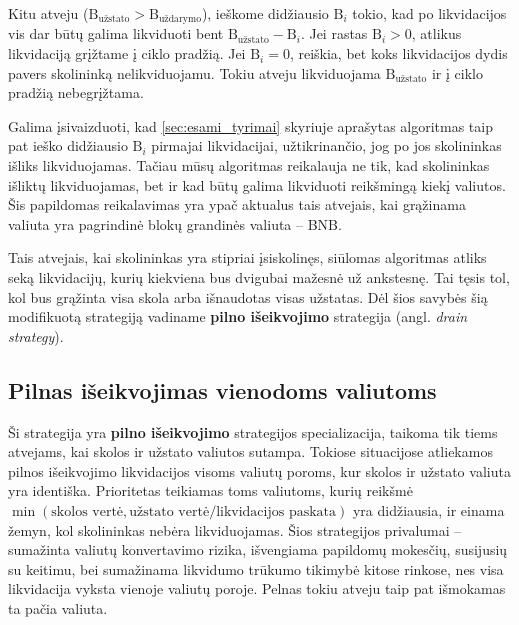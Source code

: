 \documentclass[]{VUMIFTemplateClass}
\begin{document}
Kitu atveju ($\text{B}_{\text{užstato}} > \text{B}_{\text{uždarymo}}$), ieškome didžiausio $\text{B}_{i}$ tokio, kad po likvidacijos vis dar būtų galima likviduoti bent $\text{B}_{\text{užstato}} - \text{B}_{i}$. Jei rastas $\text{B}_{i} > 0$, atlikus likvidaciją grįžtame į ciklo pradžią. Jei $\text{B}_{i} = 0$, reiškia, bet koks likvidacijos dydis pavers skolininką nelikviduojamu. Tokiu atveju likviduojama $\text{B}_{\text{užstato}}$ ir į ciklo pradžią nebegrįžtama.

Galima įsivaizduoti, kad \ref{sec:esami_tyrimai} skyriuje aprašytas algoritmas taip pat ieško didžiausio $\text{B}_{i}$ pirmajai likvidacijai, užtikrinančio, jog po jos skolininkas išliks likviduojamas. Tačiau mūsų algoritmas reikalauja ne tik, kad skolininkas išliktų likviduojamas, bet ir kad būtų galima likviduoti reikšmingą kiekį valiutos. Šis papildomas reikalavimas yra ypač aktualus tais atvejais, kai grąžinama valiuta yra pagrindinė blokų grandinės valiuta – BNB.

Tais atvejais, kai skolininkas yra stipriai įsiskolinęs, siūlomas algoritmas atliks seką likvidacijų, kurių kiekviena bus dvigubai mažesnė už ankstesnę. Tai tęsis tol, kol bus grąžinta visa skola arba išnaudotas visas užstatas. Dėl šios savybės šią modifikuotą strategiją vadiname \textbf{pilno išeikvojimo} strategija (angl. \textit{drain strategy}).

\subsection{Pilnas išeikvojimas vienodoms valiutoms}

Ši strategija yra \textbf{pilno išeikvojimo} strategijos specializacija, taikoma tik tiems atvejams, kai skolos ir užstato valiutos sutampa. Tokiose situacijose atliekamos pilnos išeikvojimo likvidacijos visoms valiutų poroms, kur skolos ir užstato valiuta yra identiška. Prioritetas teikiamas toms valiutoms, kurių reikšmė $\min(\text{skolos vertė}, \text{užstato vertė} / \text{likvidacijos paskata})$ yra didžiausia, ir einama žemyn, kol skolininkas nebėra likviduojamas. Šios strategijos privalumai – sumažinta valiutų konvertavimo rizika, išvengiama papildomų mokesčių, susijusių su keitimu, bei sumažinama likvidumo trūkumo tikimybė kitose rinkose, nes visa likvidacija vyksta vienoje valiutų poroje. Pelnas tokiu atveju taip pat išmokamas ta pačia valiuta.
\end{document}

